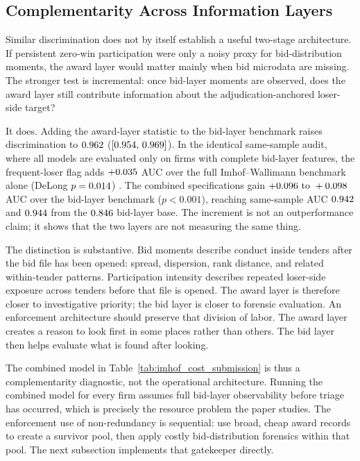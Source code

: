\subsection{Complementarity Across Information Layers}
\label{sec:complementary_signals}

Similar discrimination does not by itself establish a useful
two-stage architecture. If persistent zero-win participation were
only a noisy proxy for bid-distribution moments, the award layer
would matter mainly when bid microdata are missing. The stronger
test is incremental: once bid-layer moments are observed, does
the award layer still contribute information about the
adjudication-anchored loser-side target?

It does. Adding the award-layer statistic to the bid-layer
benchmark raises discrimination to $0.962$
($[0.954,\,0.969]$). In the identical same-sample audit,
where all models are evaluated only on firms with complete
bid-layer features, the frequent-loser flag adds
$+0.035$ AUC over the full Imhof--Wallimann benchmark
alone (DeLong $p=0.014$) \citep{delong1988comparing}.
The combined specifications
gain $+0.096\text{ to }+0.098$ AUC over the bid-layer benchmark
($p<0.001$), reaching same-sample AUC $0.942$ and
$0.944$ from the $0.846$ bid-layer base.
The increment is not an outperformance claim; it
shows that the two layers are not measuring the same thing.

The distinction is substantive. Bid moments describe conduct
inside tenders after the bid file has been opened: spread,
dispersion, rank distance, and related within-tender patterns.
Participation intensity describes repeated loser-side exposure
across tenders before that file is opened. The award layer is
therefore closer to investigative priority; the bid layer is
closer to forensic evaluation. An enforcement architecture
should preserve that division of labor. The award layer creates a
reason to look first in some places rather than others. The bid
layer then helps evaluate what is found after looking.

The combined model in Table~\ref{tab:imhof_cost_submission} is thus a
complementarity diagnostic, not the operational architecture.
Running the combined model for every firm assumes full
bid-layer observability before triage has occurred, which is
precisely the resource problem the paper studies. The enforcement
use of non-redundancy is sequential: use broad, cheap award
records to create a survivor pool, then apply costly
bid-distribution forensics within that pool. The next subsection
implements that gatekeeper directly.

